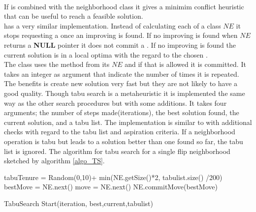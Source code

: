 \DecMargin{1em} \\
If  is combined with the neighborhood class  it gives a minimim 
conflict heuristic that can be useful to reach a feasible solution. \\ 
 has a very similar implementation. Instead of calculating each  of a 
 class $NE$ it stops requesting a  once an improving  is found. If no 
improving  is found when $NE$ returns a \textbf{NULL} pointer it does not commit a . If no 
improving  is found the current solution is in a local optima with the regard to the chosen 
. \\ 
The class  uses the method  from its  $NE$ and if that 
 is allowed it is committed. It takes an integer as argument that indicate the number of times it is 
repeated. The benefits is create new solution very fast but they are not likely to have a good quality.  
Though tabu search is a metaheuristic it is implemented the same way as the other search procedures but with some 
additions. It takes four arguments; the number of steps made(iterations), the best solution found, the current 
solution, and a tabu list. The implementation is similar to  with additional checks with regard 
to the tabu list and aspiration criteria. If a neighborhood operation is tabu but leads to a solution better than one 
found so far, the tabu list is ignored. The algorithm for tabu search for a single flip neighborhood sketched by 
algorithm \ref{algo_TS}. \\ 
\IncMargin{1em}
\begin{algorithm}[H]

  \algdata
{}
\BlankLine
\int tabuTenure = Random(0,10)+ min(NE.getSize()*2, tabulist.size() /200) \;
 bestMove = NE.next() \;
 move = NE.next() \;
NE.commitMove(bestMove) \;

\caption{TabuSearch Start(iteration, best,current,tabulist)} \label{algo_TS} 
\end{algorithm} \noindent
